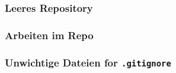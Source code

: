 \documentclass[12pt,ngerman]{beamer}
\begin{document}
\begin{frame}
\frametitle{Leeres Repository}

\begin{center}
\end{center}

\end{frame}

\begin{frame}
\frametitle{Arbeiten im Repo}

\begin{center}
\end{center}

\end{frame}

\begin{frame}
\frametitle{Unwichtige Dateien for \texttt{.gitignore}}

\begin{center}
\end{center}

\end{frame}
\end{document}
